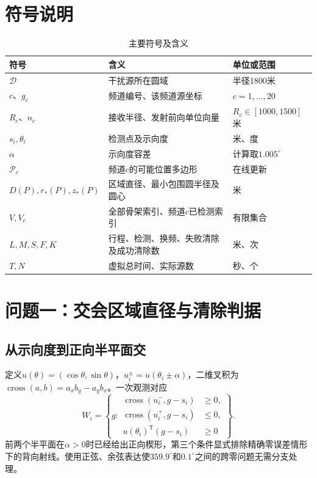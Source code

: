 \documentclass[UTF8,fontset=fandol,a4paper,zihao=-4]{ctexart}
\newcommand{\cross}[2]{\operatorname{cross}(#1,#2)}
\newcommand{\disk}{\mathcal D}
\newcommand{\poly}{\mathcal P}
\begin{document}
\section{符号说明}
\begin{table}[H]\centering\small
\caption{主要符号及含义}
\begin{tabular}{lll}\toprule
符号 & 含义 & 单位或范围\\\midrule
$\disk$ & 干扰源所在圆域 & 半径1800米\\
$c$、$g_c$ & 频道编号、该频道源坐标 & $c=1,\ldots,20$\\
$R_c$、$n_c$ & 接收半径、发射前向单位向量 & $R_c\in[1000,1500]$米\\
$s_i,\theta_i$ & 检测点及示向度 & 米、度\\
$\alpha$ & 示向度容差 & 计算取$1.005^\circ$\\
$\poly_c$ & 频道$c$的可能位置多边形 & 在线更新\\
$D(P),r_*(P),z_*(P)$ & 区域直径、最小包围圆半径及圆心 & 米\\
$V,V_c$ & 全部骨架索引、频道$c$已检测索引 & 有限集合\\
$L,M,S,F,K$ & 行程、检测、换频、失败清除及成功清除数 & 米、次\\
$T,N$ & 虚拟总时间、实际源数 & 秒、个\\\bottomrule
\end{tabular}
\end{table}


\section{问题一：交会区域直径与清除判据}
\subsection{从示向度到正向半平面交}
定义$u(\theta)=(\cos\theta,\sin\theta)$，$u_i^\pm=u(\theta_i\pm\alpha)$，二维叉积为$\cross ab=a_xb_y-a_yb_x$。一次观测对应
\begin{equation}\label{eq:wedge}
W_i=\left\{g:
\begin{aligned}
\cross{u_i^-}{g-s_i}&\ge0,\\
\cross{u_i^+}{g-s_i}&\le0,\\
u(\theta_i)^\mathsf T(g-s_i)&\ge0
\end{aligned}\right\}.
\end{equation}
前两个半平面在$\alpha>0$时已经给出正向楔形，第三个条件显式排除精确零误差情形下的背向射线。使用正弦、余弦表达使$359.9^\circ$和$0.1^\circ$之间的跨零问题无需分支处理。
\end{document}
